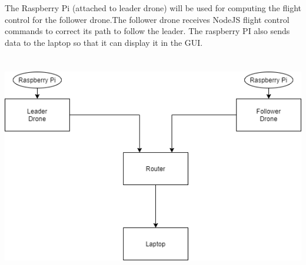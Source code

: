 \documentclass[landscape,a0paper,fontscale=0.35]{baposter} %
\begin{document}
\begin{poster}
{The Raspberry Pi (attached to leader drone) will be used for computing the flight control for the follower drone.The follower drone receives NodeJS flight control commands to correct its path to follow the leader. The raspberry PI also sends data to the laptop so that it can display it in the GUI. 
\\
\\
\\
\includegraphics[scale=0.35]{New_Drone_Connection_Diagram}

}


\end{poster}
\end{document}
